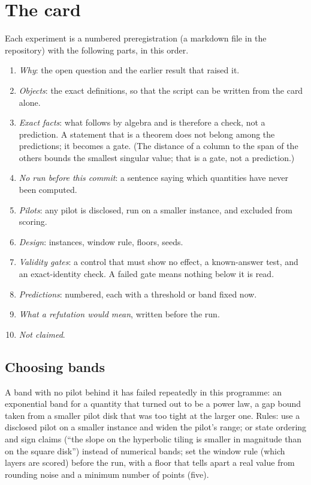 \documentclass[11pt,a4paper]{article}
\begin{document}
\section{The card}
Each experiment is a numbered preregistration (a markdown file in the repository) with the following parts, in this order.
\begin{enumerate}
\item \emph{Why}: the open question and the earlier result that raised it.
\item \emph{Objects}: the exact definitions, so that the script can be written from the card alone.
\item \emph{Exact facts}: what follows by algebra and is therefore a check, not a prediction. A statement that is a theorem does not belong among the predictions; it becomes a gate. (The distance of a column to the span of the others bounds the smallest singular value; that is a gate, not a prediction.)
\item \emph{No run before this commit}: a sentence saying which quantities have never been computed.
\item \emph{Pilots}: any pilot is disclosed, run on a smaller instance, and excluded from scoring.
\item \emph{Design}: instances, window rule, floors, seeds.
\item \emph{Validity gates}: a control that must show no effect, a known-answer test, and an exact-identity check. A failed gate means nothing below it is read.
\item \emph{Predictions}: numbered, each with a threshold or band fixed now.
\item \emph{What a refutation would mean}, written before the run.
\item \emph{Not claimed}.
\end{enumerate}

\subsection*{Choosing bands}
A band with no pilot behind it has failed repeatedly in this programme: an exponential band for a quantity that turned out to be a power law, a gap bound taken from a smaller pilot disk that was too tight at the larger one. Rules: use a disclosed pilot on a smaller instance and widen the pilot's range;
or state ordering and sign claims (``the slope on the hyperbolic tiling is smaller in magnitude than on the square disk'') instead of numerical bands; set the window rule (which layers are scored) before the run, with a floor that tells apart a real value from rounding noise and a minimum number of points (five).
\end{document}
